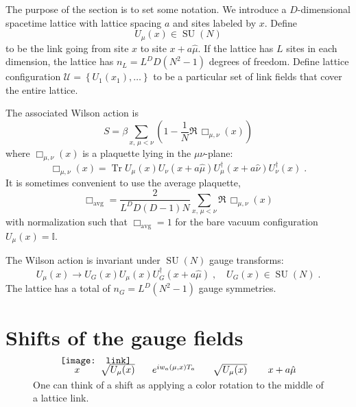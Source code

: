 \documentclass[preprint,aps,prd]{revtex4-2}
\newcommand{\da}{\dagger}  %
\newcommand{\be}{\begin{equation}}
\newcommand{\eq}{\end{equation}}
\newcommand{\plaquette}{\Box}
\newcommand{\config}{\mathcal{U}}
\DeclareMathOperator{\SU}{SU}
\DeclareMathOperator{\Tr}{Tr}
\begin{document}
The purpose of the section is to set some notation.
We introduce a $D$-dimensional spacetime lattice with lattice
spacing $a$ and sites labeled by $x$.  Define
\be
  U_\mu(x) \in \SU(N)
\eq
to be the link going from site $x$ to site $x+a \hat{\mu}$.
If the lattice has $L$ sites in each dimension, the lattice has
$n_L=L^D D \left(N^2-1\right)$ degrees of freedom.
Define lattice configuration
$\config=\left\{U_1(x_1),\ldots\right\}$
to be a particular set of link fields that cover the entire lattice.

The associated Wilson action is
%
\be
S = \beta \sum_{x,\, \mu<\nu} \left(1-\frac{1}{N} \Re\, \plaquette_{\mu,\nu}(x)\right)
\eq
where $\plaquette_{\mu,\nu}(x)$ is a plaquette lying in the $\mu\nu$-plane:
\be
\plaquette_{\mu,\nu}(x) = \Tr U_\mu(x) U_\nu(x+a \hat{\mu})
U_\mu^\da(x+a\hat{\nu}) U_\nu^\da(x) \; .
\eq
It is sometimes convenient to use the average plaquette,
\be
      \plaquette_\mathrm{avg} = \frac{2}{L^D D (D-1) N}
             \sum_{x,\,\mu<\nu} \Re\,\plaquette_{\mu,\nu}(x) 
\eq
with normalization such that $\plaquette_\mathrm{avg}=1$
for the bare vacuum configuration $U_\mu(x) = \mathbb{I}$.

The Wilson action is invariant under $\SU(N)$ gauge transforms:
%
\be
    U_\mu(x) \to U_G(x) U_\mu(x) U_G^\da(x+a \hat{\mu})
         \; , \quad U_G(x) \in \SU(N) \; .
\eq
%
The lattice has a total of $n_G = L^D\left(N^2-1\right)$ gauge symmetries.

\section{Shifts of the gauge fields}

\begin{figure}
  \[
  \begin{array}{l}
    \mbox{} \hspace{0.2in} x \hspace{0.3in} \sqrt{U_\mu(x)}
    \hspace{0.25in} e^{i w_{a}(\mu, x) T_a}
    \hspace{0.25in} \sqrt{U_\mu(x)} \hspace{0.3in} x+a\hat{\mu} \\[-0.3in]
  \texttt{[image: link]}
  \end{array}
  \]
  \caption{One can think of a shift as applying a color rotation
    to the middle of a lattice link. \label{shift}}
\end{figure}
\end{document}
